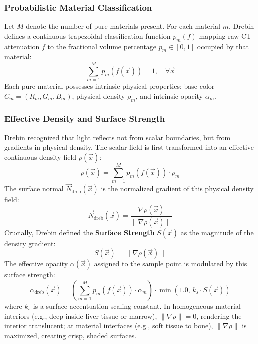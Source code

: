 \documentclass[10pt,twocolumn,a4paper]{article}
\begin{document}
\subsubsection{Probabilistic Material Classification}
Let $M$ denote the number of pure materials present. For each material $m$, Drebin defines a continuous trapezoidal classification function $p_m(f)$ mapping raw CT attenuation $f$ to the fractional volume percentage $p_m \in [0, 1]$ occupied by that material:
\begin{equation}
\sum_{m=1}^{M} p_m(f(\vec{x})) = 1, \quad \forall \vec{x}
\end{equation}
Each pure material possesses intrinsic physical properties: base color $C_m = (R_m, G_m, B_m)$, physical density $\rho_m$, and intrinsic opacity $\alpha_m$.

\subsubsection{Effective Density and Surface Strength}
Drebin recognized that light reflects not from scalar boundaries, but from gradients in physical density. The scalar field is first transformed into an effective continuous density field $\rho(\vec{x})$:
\begin{equation}
\rho(\vec{x}) = \sum_{m=1}^{M} p_m(f(\vec{x})) \cdot \rho_m
\end{equation}
The surface normal $\vec{N}_{\text{dreb}}(\vec{x})$ is the normalized gradient of this physical density field:
\begin{equation}
\vec{N}_{\text{dreb}}(\vec{x}) = \frac{\nabla \rho(\vec{x})}{\|\nabla \rho(\vec{x})\|}
\end{equation}
Crucially, Drebin defined the \textbf{Surface Strength} $S(\vec{x})$ as the magnitude of the density gradient:
\begin{equation}
S(\vec{x}) = \|\nabla \rho(\vec{x})\|
\end{equation}
The effective opacity $\alpha(\vec{x})$ assigned to the sample point is modulated by this surface strength:
\begin{equation}
\alpha_{\text{dreb}}(\vec{x}) = \left( \sum_{m=1}^{M} p_m(f(\vec{x})) \cdot \alpha_m \right) \cdot \min(1.0, \, k_s \cdot S(\vec{x}))
\label{eq:drebin_opacity}
\end{equation}
where $k_s$ is a surface accentuation scaling constant. In homogeneous material interiors (e.g., deep inside liver tissue or marrow), $\|\nabla \rho\| = 0$, rendering the interior translucent; at material interfaces (e.g., soft tissue to bone), $\|\nabla \rho\|$ is maximized, creating crisp, shaded surfaces.
\end{document}
